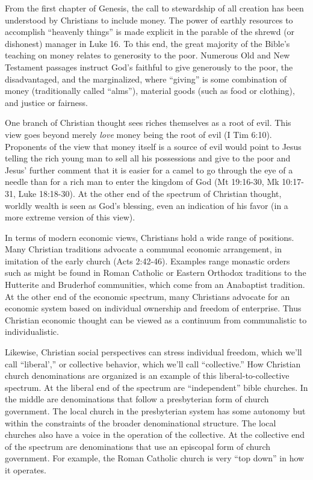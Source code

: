 \documentclass[12pt]{article}
\begin{document}
From the first chapter of Genesis, the call to stewardship of all creation has
been understood by Christians to include money. The power of earthly resources to accomplish ``heavenly things'' is made
explicit in the parable of the shrewd (or dishonest) manager in Luke 16. To this end, the great majority of the Bible's
teaching on money relates to generosity to the poor. Numerous Old and New Testament passages instruct God's faithful to
give generously to the poor, the disadvantaged, and the marginalized, where ``giving'' is some combination of money
(traditionally called ``alms''), material goods (such as food or clothing), and justice or fairness.

One branch of Christian thought sees riches themselves as a root of evil. This view goes beyond merely \emph{love} money
being the root of evil (I Tim 6:10). Proponents of the view that money itself is a source of evil would point to Jesus
telling the rich young man to sell all his possessions and give to the poor and Jesus' further comment that it is easier
for a camel to go through the eye of a needle than for a rich man to enter the kingdom of God (Mt 19:16-30, Mk 10:17-31,
Luke 18:18-30). At the other end of the spectrum of Christian thought, worldly wealth is seen as God's blessing, even an
indication of his favor (in a more extreme version of this view).

In terms of modern economic views, Christians hold a wide range of positions. Many Christian traditions advocate a communal
economic arrangement, in imitation of the early church (Acts 2:42-46). Examples range monastic orders such as might be found
in Roman Catholic or Eastern Orthodox traditions to the Hutterite and Bruderhof communities, which come from an Anabaptist tradition.
At the other end of the economic spectrum, many Christians advocate for an economic system based on individual ownership
and freedom of enterprise. Thus Christian economic thought can be viewed as a continuum from communalistic to individualistic.

Likewise, Christian social perspectives can stress individual freedom, which we'll call ``liberal','' or collective behavior, which
we'll call ``collective.'' How Christian church denominations are organized is an example of this liberal-to-collective spectrum.
At the liberal end of the spectrum are ``independent'' bible churches. In the middle are denominations that follow a presbyterian form of church 
government. The local church in the presbyterian system has some autonomy but within the constraints of the broader 
denominational structure. The local churches also have a voice in the operation of the collective. At the collective end of the spectrum 
are denominations that use an episcopal form of church government. For example, the Roman Catholic church is very ``top down'' 
in how it operates.
\end{document}
